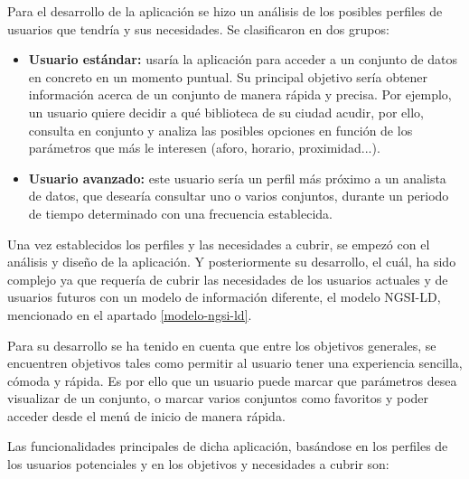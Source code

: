Para el desarrollo de la aplicación se hizo un análisis de los posibles perfiles de usuarios que tendría y sus necesidades. Se clasificaron en dos grupos:

\begin{itemize}
    \item \textbf{Usuario estándar:} usaría la aplicación para acceder a un conjunto de datos en concreto en un momento puntual. Su principal objetivo sería obtener información acerca de un conjunto de manera rápida y precisa. Por ejemplo, un usuario quiere decidir a qué biblioteca de su ciudad acudir, por ello, consulta en conjunto y analiza las posibles opciones en función de los parámetros que más le interesen (aforo, horario, proximidad...).
    \item \textbf{Usuario avanzado:} este usuario sería un perfil más próximo a un analista de datos, que desearía consultar uno o varios conjuntos, durante un periodo de tiempo determinado con una frecuencia establecida.
\end{itemize}

Una vez establecidos los perfiles y las necesidades a cubrir, se empezó con el análisis y diseño de la aplicación. Y posteriormente su desarrollo, el cuál, ha sido complejo ya que requería de cubrir las necesidades de los usuarios actuales y de usuarios futuros con un modelo de información diferente, el modelo NGSI-LD, mencionado en el apartado \ref{modelo-ngsi-ld}.

Para su desarrollo se ha tenido en cuenta que entre los objetivos generales, se encuentren objetivos tales como permitir al usuario tener una experiencia sencilla, cómoda y rápida. Es por ello que un usuario puede marcar que parámetros desea visualizar de un conjunto, o marcar varios conjuntos como favoritos y poder acceder desde el menú de inicio de manera rápida.

Las funcionalidades principales de dicha aplicación, basándose en los perfiles de los usuarios potenciales y en los objetivos y necesidades a cubrir son:

